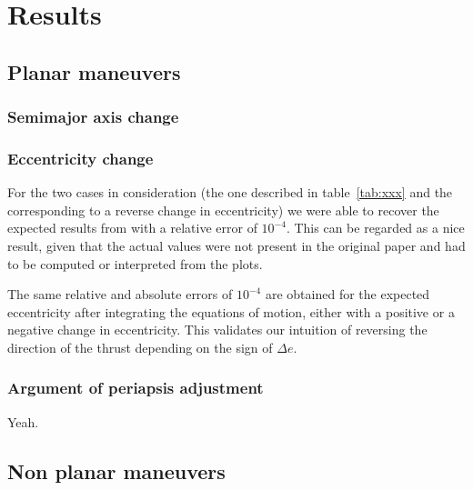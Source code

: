 \chapter{Results} \label{sec:results}

\section{Planar maneuvers} \label{sec:resplanar}

\subsection{Semimajor axis change} \label{sec:ressma}

\subsection{Eccentricity change} \label{sec:resecc}

For the two cases in consideration (the one described in table~\ref{tab:xxx} and the corresponding to a reverse change in eccentricity) we were able to recover the expected results from \cite{pollard1997simplified} with a relative error of $10^{-4}$. This can be regarded as a nice result, given that the actual values were not present in the original paper and had to be computed or interpreted from the plots.

The same relative and absolute errors of $10^{-4}$ are obtained for the expected eccentricity after integrating the equations of motion, either with a positive or a negative change in eccentricity. This validates our intuition of reversing the direction of the thrust depending on the sign of $\Delta e$.

\subsection{Argument of periapsis adjustment}

Yeah.

\clearpage

\section{Non planar maneuvers} \label{sec:resnonplanar}

